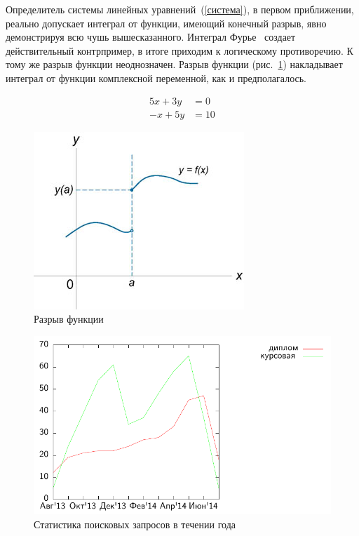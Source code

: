\documentclass[14pt]{matmex-diploma-custom}
\begin{document}
Определитель системы линейных уравнений~(\ref{система}),
в первом приближении, реально допускает интеграл от функции, имеющий конечный разрыв,
явно демонстрируя всю чушь вышесказанного. Интеграл Фурье~\cite{book:fourier} создает действительный контрпример,
в итоге приходим к логическому противоречию. К тому же разрыв функции неоднозначен.
Разрыв функции (рис.~\ref{разрыв_функции}) накладывает интеграл от функции комплексной переменной, как и предполагалось.


\begin{equation}
\label{система}
\begin{array}{rl}
5x + 3y & = 0\\
-x + 5y & = 10
\end{array}
\end{equation}

\begin{figure}[t]
\label{разрыв_функции}
\centering
\includegraphics{fig1.jpg}
\caption{Разрыв функции}
\end{figure}

\begin{figure}[h]
	\includegraphics{thesis-search-trends}
	\caption{Статистика поисковых запросов в течении года}
\end{figure}
\end{document}
